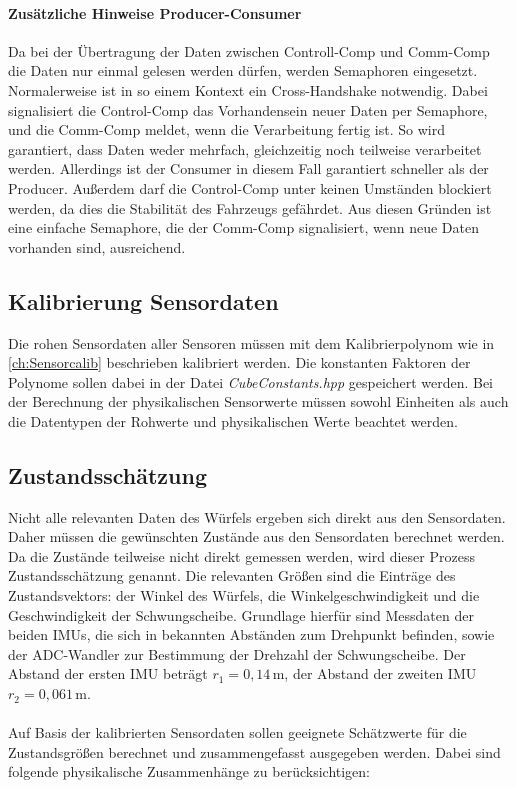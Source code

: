             \paragraph{Zusätzliche Hinweise Producer-Consumer}
                Da bei der Übertragung der Daten zwischen Controll-Comp und Comm-Comp die Daten nur einmal gelesen werden dürfen, werden Semaphoren eingesetzt. Normalerweise ist in so einem Kontext ein Cross-Handshake notwendig. Dabei signalisiert die Control-Comp das Vorhandensein neuer Daten per Semaphore, und die Comm-Comp meldet, wenn die Verarbeitung fertig ist. So wird garantiert, dass Daten weder mehrfach, gleichzeitig noch teilweise verarbeitet werden. Allerdings ist der Consumer in diesem Fall garantiert schneller als der Producer. Außerdem darf die Control-Comp unter keinen Umständen blockiert werden, da dies die Stabilität des Fahrzeugs gefährdet. Aus diesen Gründen ist eine einfache Semaphore, die der Comm-Comp signalisiert, wenn neue Daten vorhanden sind, ausreichend.

        \subsection{Kalibrierung Sensordaten}
            Die rohen Sensordaten aller Sensoren müssen mit dem Kalibrierpolynom wie in \autoref{ch:Sensorcalib} beschrieben kalibriert werden. Die konstanten Faktoren der Polynome sollen dabei in der Datei \textit{CubeConstants.hpp} gespeichert werden. Bei der Berechnung der physikalischen Sensorwerte müssen sowohl Einheiten als auch die Datentypen der Rohwerte und physikalischen Werte beachtet werden.

        \subsection{Zustandsschätzung}
            Nicht alle relevanten Daten des Würfels ergeben sich direkt aus den Sensordaten. Daher müssen die gewünschten Zustände aus den Sensordaten berechnet werden. Da die Zustände teilweise nicht direkt gemessen werden, wird dieser Prozess Zustandsschätzung genannt. Die relevanten Größen sind die Einträge des Zustandsvektors: der Winkel des Würfels, die Winkelgeschwindigkeit und die Geschwindigkeit der Schwungscheibe. Grundlage hierfür sind Messdaten der beiden IMUs, die sich in bekannten Abständen zum Drehpunkt befinden, sowie der ADC-Wandler zur Bestimmung der Drehzahl der Schwungscheibe. Der Abstand der ersten IMU beträgt $r_1 = 0{,}14\,\mathrm{m}$, der Abstand der zweiten IMU $r_2 = 0{,}061\,\mathrm{m}$.\\
            \\
            Auf Basis der kalibrierten Sensordaten sollen geeignete Schätzwerte für die Zustandsgrößen berechnet und zusammengefasst ausgegeben werden. Dabei sind folgende physikalische Zusammenhänge zu berücksichtigen:

